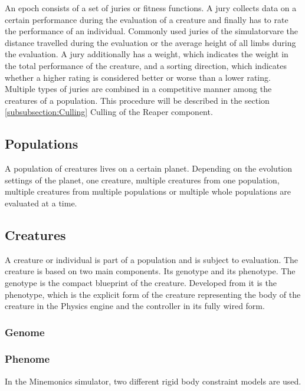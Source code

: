 \documentclass[main]{subfiles}
\begin{document}
An epoch consists of a set of juries or fitness functions. A jury collects data on a certain performance during the evaluation of a creature and finally has to rate the performance of an individual. Commonly used juries of the simulatorvare the distance travelled during the evaluation or the average height of all limbs during the evaluation. A jury additionally has a weight, which indicates the weight in the total performance of the creature, and a sorting direction, which indicates whether a higher rating is considered better or worse than a lower rating. Multiple types of juries are combined in a competitive manner among the creatures of a population. This procedure will be described in the section \ref{subsubsection:Culling} Culling of the Reaper component.

\subsection{Populations}

A population of creatures lives on a certain planet. Depending on the evolution settings of the planet, one creature, multiple creatures from one population, multiple creatures from multiple populations or multiple whole populations are evaluated at a time.

\subsection{Creatures}

A creature or individual is part of a population and is subject to evaluation. The creature is based on two main components. Its genotype and its phenotype. The genotype is the compact blueprint of the creature. Developed from it is the phenotype, which is the explicit form of the creature representing the body of the creature in the Physics engine and the controller in its fully wired form.

\subsubsection{Genome}

\lipsum[8]

\subsubsection{Phenome}

In the Minemonics simulator, two different rigid body constraint models are used. 
\end{document}

